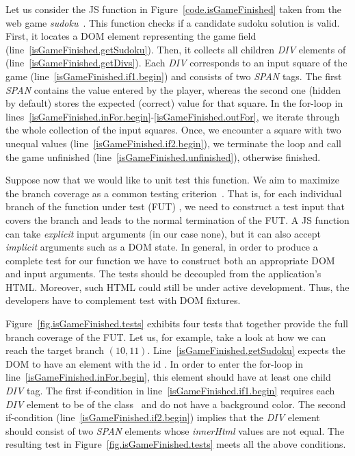 Let us consider the JS function  in Figure~\ref{code.isGameFinished} taken from the web game \emph{sudoku}~\cite{sudoku}. This function checks if a candidate sudoku solution is valid. First, it locates a DOM element  representing the game field (line~\ref{isGameFinished.getSudoku}). Then, it collects all children \emph{DIV} elements of  (line~\ref{isGameFinished.getDivs}). Each \emph{DIV} corresponds to an input square of the game (line~\ref{isGameFinished.if1.begin}) and consists of two \emph{SPAN} tags. The first \emph{SPAN} contains the value entered by the player, whereas the second one (hidden by default) stores the expected (correct) value for that square. In the for-loop in lines~\ref{isGameFinished.inFor.begin}-\ref{isGameFinished.outFor}, we iterate through the whole collection of the input squares. Once, we encounter a square with two unequal values (line~\ref{isGameFinished.if2.begin}), we terminate the loop and call the game unfinished (line~\ref{isGameFinished.unfinished}), otherwise finished.

Suppose now that we would like to unit test this function. We aim to maximize the branch coverage as a common testing criterion~\cite{zhu1997software}. That is, for each individual branch of the function under test (FUT) , we need to construct a test input that covers the branch and leads to the normal termination of the FUT. A JS function can take \emph{explicit} input arguments (in our case none), but it can also accept \emph{implicit} arguments such as a DOM state. In general, in order to produce a complete test for our function we have to construct both an appropriate DOM and input arguments. The tests should be decoupled from the application's HTML. Moreover, such HTML could still be under active development. Thus, the developers have to complement test with DOM fixtures.


Figure~\ref{fig.isGameFinished.tests} exhibits four tests that together provide the full branch coverage of the FUT. Let us, for example, take a look at how we can reach the target branch $(10,11)$. Line~\ref{isGameFinished.getSudoku} expects the DOM to have an element with the id \textquotesingle{}\textquotesingle. In order to enter the for-loop in line~\ref{isGameFinished.inFor.begin}, this element should have at least one child \emph{DIV} tag. The first if-condition in line~\ref{isGameFinished.if1.begin} requires each \emph{DIV} element to be of the class \textquotesingle{}\textquotesingle\, and do not have a background color. The second if-condition (line~\ref{isGameFinished.if2.begin}) implies that the \emph{DIV} element should consist of two \emph{SPAN} elements whose \emph{innerHtml} values are not equal. The resulting test  in Figure~\ref{fig.isGameFinished.tests} meets all the above conditions.


